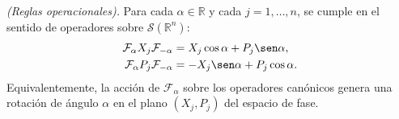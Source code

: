             \begin{proposition}\label{prop:Cap24ReglasOperacionales}
                \textit{(Reglas operacionales).} Para cada $\alpha \in \mathbb{R}$ y cada $j=1,\dots,n$, se cumple en el sentido de operadores sobre $\mathcal{S}(\mathbb{R}^n)$:
                \begin{align}
                    \mathcal{F}_\alpha X_j \mathcal{F}_{-\alpha} & = X_j \cos\alpha + P_j \sen\alpha, \label{eq:Cap24ReglaX} \\
                    \mathcal{F}_\alpha P_j \mathcal{F}_{-\alpha} & = -X_j \sen\alpha + P_j \cos\alpha. \label{eq:Cap24ReglaP}
                \end{align}
                Equivalentemente, la acción de $\mathcal{F}_\alpha$ sobre los operadores canónicos genera una rotación de ángulo $\alpha$ en el plano $(X_j, P_j)$ del espacio de fase.
            \end{proposition}
